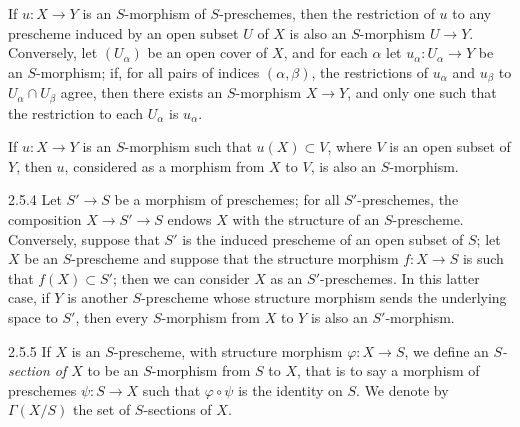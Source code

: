 If $u\colon X\to Y$ is an $S$-morphism of $S$-preschemes, then the restriction of $u$ to any prescheme induced by an open subset $U$ of $X$ is also an $S$-morphism $U\to Y$.
Conversely, let $(U_\alpha)$ be an open cover of $X$, and for each $\alpha$ let $u_\alpha\colon U_\alpha\to Y$ be an $S$-morphism; if, for all pairs of indices $(\alpha,\beta)$, the restrictions of $u_\alpha$ and $u_\beta$ to $U_\alpha\cap U_\beta$ agree, then there exists an $S$-morphism $X\to Y$, and only one such that the restriction to each $U_\alpha$ is $u_\alpha$.

If $u\colon X\to Y$ is an $S$-morphism such that $u(X)\subset V$, where $V$ is an open subset of $Y$, then $u$, considered as a morphism from $X$ to $V$, is also an $S$-morphism.

\begin{env}{2.5.4}
    Let $S'\to S$ be a morphism of preschemes; for all $S'$-preschemes, the composition $X\to S'\to S$ endows $X$ with the structure of an $S$-prescheme.
    Conversely, suppose that $S'$ is the induced prescheme of an open subset of $S$; let $X$ be an $S$-prescheme and suppose that the structure morphism $f\colon X\to S$ is such that $f(X)\subset S'$; then we can consider $X$ as an $S'$-preschemes.
    In this latter case, if $Y$ is another $S$-prescheme whose structure morphism sends the underlying space to $S'$, then every $S$-morphism from $X$ to $Y$ is also an $S'$-morphism.
\end{env}

\begin{env}{2.5.5}
    If $X$ is an $S$-prescheme, with structure morphism $\varphi\colon X\to S$, we define an \emph{$S$-section of $X$} to be an $S$-morphism from $S$ to $X$, that is to say a morphism of preschemes $\psi\colon S\to X$ such that $\varphi\circ\psi$ is the identity on $S$.
    We denote by $\Gamma(X/S)$ the set of $S$-sections of $X$.
\end{env}


